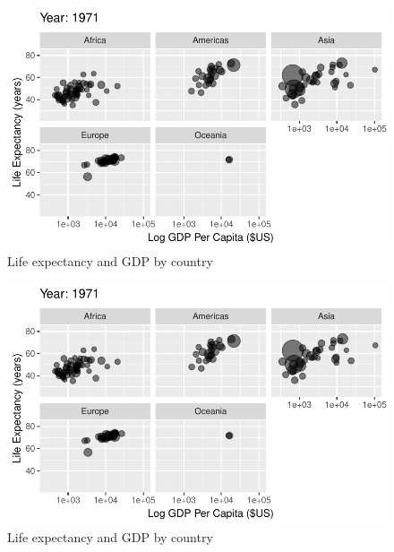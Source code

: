 \documentclass[
  letterpaper,
  DIV=11,
  numbers=noendperiod]{scrreport}
\theoremstyle{definition}
\theoremstyle{remark}
\begin{document}
\begin{figure}

{\centering \includegraphics{index_files/figure-pdf/fig-anim-lifegdp-35.pdf}

}

\caption{\label{fig-anim-lifegdp-35}Life expectancy and GDP by country}

\end{figure}

\begin{figure}

{\centering \includegraphics{index_files/figure-pdf/fig-anim-lifegdp-36.pdf}

}

\caption{\label{fig-anim-lifegdp-36}Life expectancy and GDP by country}

\end{figure}
\end{document}
